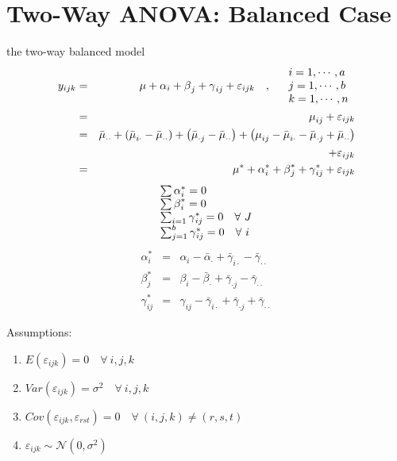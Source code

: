 \documentclass{article}
\begin{document}
\bigskip

\bigskip

\section{Two-Way ANOVA: Balanced Case}

the two-way balanced model%
\begin{eqnarray*}
y_{ijk} &=&\mu +\alpha _{i}+\beta _{j}+\gamma _{ij}+\varepsilon _{ijk}\quad
,\quad 
\begin{tabular}{l}
$i=1,\cdots ,a$ \\ 
$j=1,\cdots ,b$ \\ 
$k=1,\cdots ,n$%
\end{tabular}
\\
&=&\mu _{ij}+\varepsilon _{ijk} \\
&=&\bar{\mu}_{\cdot \cdot }+\left( \bar{\mu}_{i\cdot }-\bar{\mu}_{\cdot
\cdot }\right) +\left( \bar{\mu}_{\cdot j}-\bar{\mu}_{\cdot \cdot }\right)
+\left( \mu _{ij}-\bar{\mu}_{i\cdot }-\bar{\mu}_{\cdot j}+\bar{\mu}_{\cdot
\cdot }\right) \\
&&+\varepsilon _{ijk} \\
&=&\mu ^{\ast }+\alpha _{i}^{\ast }+\beta _{j}^{\ast }+\gamma _{ij}^{\ast
}+\varepsilon _{ijk}
\end{eqnarray*}%
\begin{equation*}
\begin{tabular}{l}
$\sum \alpha _{i}^{\ast }=0$ \\ 
$\sum \beta _{i}^{\ast }=0$ \\ 
$\sum_{i=1}\gamma _{ij}^{\ast }=0\quad \forall \ J$ \\ 
$\sum_{j=1}^{b}\gamma _{ij}^{\ast }=0\quad \forall \ i$%
\end{tabular}%
\end{equation*}%
\begin{eqnarray*}
\alpha _{i}^{\ast } &=&\alpha _{i}-\bar{\alpha}_{\cdot }+\bar{\gamma}%
_{i\cdot }-\bar{\gamma}_{\cdot \cdot } \\
\beta _{j}^{\ast } &=&\beta _{i}-\bar{\beta}_{\cdot }+\bar{\gamma}_{\cdot j}-%
\bar{\gamma}_{\cdot \cdot } \\
\gamma _{ij}^{\ast } &=&\gamma _{ij}-\bar{\gamma}_{i\cdot }+\bar{\gamma}%
_{\cdot j}+\bar{\gamma}_{\cdot \cdot }
\end{eqnarray*}

Assumptions:

\begin{enumerate}
\item $E\left( \varepsilon _{ijk}\right) =0\quad \forall \ i,j,k$

\item $Var\left( \varepsilon _{ijk}\right) =\sigma ^{2}\quad \forall \ i,j,k$

\item $Cov\left( \varepsilon _{ijk},\varepsilon _{rst}\right) =0\quad
\forall \ \left( i,j,k\right) \neq \left( r,s,t\right) $

\item $\varepsilon _{ijk}\sim \mathcal{N}\left( 0,\sigma ^{2}\right) $
\end{enumerate}
\end{document}
